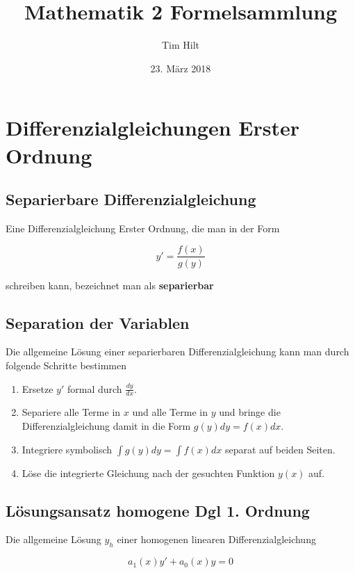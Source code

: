 \message{ !name(Mathe2Formelsammlung.tex)}\documentclass[8pt, a4paper]{article}
\title{Mathematik 2 Formelsammlung}
\author{Tim Hilt}
\date{23. März 2018}
\begin{document}


\maketitle
\pagebreak

\tableofcontents
\pagebreak

\setcounter{section}{13}
\section{Differenzialgleichungen Erster Ordnung}

\subsection{Separierbare Differenzialgleichung}
Eine Differenzialgleichung Erster Ordnung, die man in der Form

\[
  y'=\frac{f(x)}{g(y)}
\]

schreiben kann, bezeichnet man als \textbf{separierbar}

\subsection{Separation der Variablen}

Die allgemeine Lösung einer separierbaren Differenzialgleichung kann man durch folgende Schritte bestimmen
\begin{enumerate}
\item Ersetze \(y'\) formal durch \(\frac{dy}{dx}\).
  \item Separiere alle Terme in \(x\) und alle Terme in \(y\) und bringe die Differenzialgleichung damit in die Form \(g(y)dy=f(x)dx\).
  \item Integriere symbolisch \(\int{g(y)dy} = \int{f(x)dx}\) separat auf beiden Seiten.
  \item Löse die integrierte Gleichung nach der gesuchten Funktion \(y(x)\) auf.
\end{enumerate}

\subsection{Lösungsansatz homogene Dgl 1. Ordnung}

Die allgemeine Lösung \(y_h\) einer homogenen linearen Differenzialgleichung

\[
  a_1(x)y'+a_0(x)y=0
\]
\end{document}
